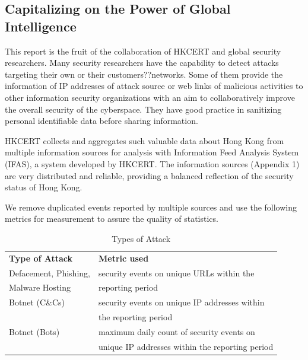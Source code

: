 \documentclass[__FONT_SIZE__]{extarticle}
\begin{document}
\subsection*{Capitalizing on the Power of Global Intelligence}

This report is the fruit of the collaboration of HKCERT and global security researchers. Many security researchers have the capability to detect attacks targeting their own or their customers??networks. Some of them provide the information of IP addresses of attack source or web links of malicious activities to other information security organizations with an aim to collaboratively improve the overall security of the cyberspace. They have good practice in sanitizing personal identifiable data before sharing information.

HKCERT collects and aggregates such valuable data about Hong Kong from multiple information sources for analysis with Information Feed Analysis System (IFAS), a system developed by HKCERT. The information sources (Appendix 1) are very distributed and reliable, providing a balanced reflection of the security status of Hong Kong.

We remove duplicated events reported by multiple sources and use the following metrics for measurement to assure the quality of statistics.

\begin{table}[b]
\centering
\caption{Types of Attack}
\begin{tabular}{ll}
\hline
\textbf{ Type of Attack}              & \textbf{ Metric used}                                                                         \\\hhline{==}
Defacement, Phishing,                 & security events on unique URLs within the             \\
Malware Hosting                       & reporting period\\\hline
Botnet (C\&Cs)                        & security events on unique IP addresses within    \\
                                      & the reporting period \\\hline
Botnet (Bots)                         & maximum daily count of security events on  \\
                                      & unique IP addresses within the reporting period \\\hline
\end{tabular}

\end{table}
\end{document}
